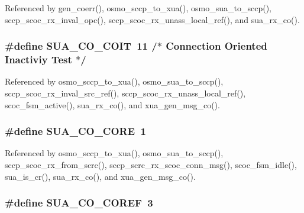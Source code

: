 Referenced by gen\+\_\+coerr(), osmo\+\_\+sccp\+\_\+to\+\_\+xua(), osmo\+\_\+sua\+\_\+to\+\_\+sccp(), sccp\+\_\+scoc\+\_\+rx\+\_\+inval\+\_\+opc(), sccp\+\_\+scoc\+\_\+rx\+\_\+unass\+\_\+local\+\_\+ref(), and sua\+\_\+rx\+\_\+co().

\subsubsection[{S\+U\+A\+\_\+\+C\+O\+\_\+\+C\+O\+IT}]{\setlength{\rightskip}{0pt plus 5cm}\#define S\+U\+A\+\_\+\+C\+O\+\_\+\+C\+O\+IT~11 /$\ast$ Connection Oriented Inactiviy Test $\ast$/}\label{sua_8h_ad9ad3a32f9ccad58873cb3e3162b1c4e}


Referenced by osmo\+\_\+sccp\+\_\+to\+\_\+xua(), osmo\+\_\+sua\+\_\+to\+\_\+sccp(), sccp\+\_\+scoc\+\_\+rx\+\_\+inval\+\_\+src\+\_\+ref(), sccp\+\_\+scoc\+\_\+rx\+\_\+unass\+\_\+local\+\_\+ref(), scoc\+\_\+fsm\+\_\+active(), sua\+\_\+rx\+\_\+co(), and xua\+\_\+gen\+\_\+msg\+\_\+co().

\subsubsection[{S\+U\+A\+\_\+\+C\+O\+\_\+\+C\+O\+RE}]{\setlength{\rightskip}{0pt plus 5cm}\#define S\+U\+A\+\_\+\+C\+O\+\_\+\+C\+O\+RE~1}\label{sua_8h_a236f17f3411a25cbb206df257450bcd5}


Referenced by osmo\+\_\+sccp\+\_\+to\+\_\+xua(), osmo\+\_\+sua\+\_\+to\+\_\+sccp(), sccp\+\_\+scoc\+\_\+rx\+\_\+from\+\_\+scrc(), sccp\+\_\+scrc\+\_\+rx\+\_\+scoc\+\_\+conn\+\_\+msg(), scoc\+\_\+fsm\+\_\+idle(), sua\+\_\+is\+\_\+cr(), sua\+\_\+rx\+\_\+co(), and xua\+\_\+gen\+\_\+msg\+\_\+co().

\subsubsection[{S\+U\+A\+\_\+\+C\+O\+\_\+\+C\+O\+R\+EF}]{\setlength{\rightskip}{0pt plus 5cm}\#define S\+U\+A\+\_\+\+C\+O\+\_\+\+C\+O\+R\+EF~3}\label{sua_8h_a2f3681f9b0c0e9d39e3a07b4256a48e3}


